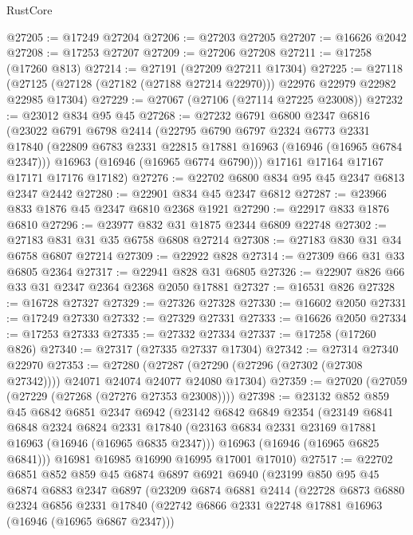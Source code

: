 \begin{lexlean}{RustCore}
\begin{coremodule}
@27205 := @17249 @27204
@27206 := @27203 @27205
@27207 := @16626 @2042
@27208 := @17253 @27207
@27209 := @27206 @27208
@27211 := @17258 (@17260 @813)
@27214 := @27191 (@27209 @27211 @17304)
@27225 := @27118
    (@27125 (@27128 (@27182 (@27188 @27214 @22970))) @22976 @22979 @22982 @22985 @17304)
@27229 := @27067 (@27106 (@27114 @27225 @23008))
@27232 := @23012 @834 @95 @45
@27268 := @27232
    @6791
    @6800
    @2347
    @6816
    (@23022
      @6791
      @6798
      @2414
      (@22795
        @6790
        @6797
        @2324
        @6773
        @2331
        @17840
        (@22809 @6783 @2331 @22815 @17881 @16963 (@16946 (@16965 @6784 @2347)))
        @16963
        (@16946 (@16965 @6774 @6790)))
      @17161
      @17164
      @17167
      @17171
      @17176
      @17182)
@27276 := @22702 @6800 @834 @95 @45 @2347 @6813 @2347 @2442
@27280 := @22901 @834 @45 @2347 @6812
@27287 := @23966 @833 @1876 @45 @2347 @6810 @2368 @1921
@27290 := @22917 @833 @1876 @6810
@27296 := @23977 @832 @31 @1875 @2344 @6809 @22748
@27302 := @27183 @831 @31 @35 @6758 @6808 @27214
@27308 := @27183 @830 @31 @34 @6758 @6807 @27214
@27309 := @22922 @828
@27314 := @27309 @66 @31 @33 @6805 @2364
@27317 := @22941 @828 @31 @6805
@27326 := @22907 @826 @66 @33 @31 @2347 @2364 @2368 @2050 @17881
@27327 := @16531 @826
@27328 := @16728 @27327
@27329 := @27326 @27328
@27330 := @16602 @2050
@27331 := @17249 @27330
@27332 := @27329 @27331
@27333 := @16626 @2050
@27334 := @17253 @27333
@27335 := @27332 @27334
@27337 := @17258 (@17260 @826)
@27340 := @27317 (@27335 @27337 @17304)
@27342 := @27314 @27340 @22970
@27353 := @27280
    (@27287 (@27290 (@27296 (@27302 (@27308 @27342)))) @24071 @24074 @24077 @24080 @17304)
@27359 := @27020 (@27059 (@27229 (@27268 (@27276 @27353 @23008))))
@27398 := @23132
    @852
    @859
    @45
    @6842
    @6851
    @2347
    @6942
    (@23142
      @6842
      @6849
      @2354
      (@23149
        @6841
        @6848
        @2324
        @6824
        @2331
        @17840
        (@23163 @6834 @2331 @23169 @17881 @16963 (@16946 (@16965 @6835 @2347)))
        @16963
        (@16946 (@16965 @6825 @6841)))
      @16981
      @16985
      @16990
      @16995
      @17001
      @17010)
@27517 := @22702
    @6851
    @852
    @859
    @45
    @6874
    @6897
    @6921
    @6940
    (@23199
      @850
      @95
      @45
      @6874
      @6883
      @2347
      @6897
      (@23209
        @6874
        @6881
        @2414
        (@22728
          @6873
          @6880
          @2324
          @6856
          @2331
          @17840
          (@22742 @6866 @2331 @22748 @17881 @16963 (@16946 (@16965 @6867 @2347)))

\end{coremodule}
\end{lexlean}
